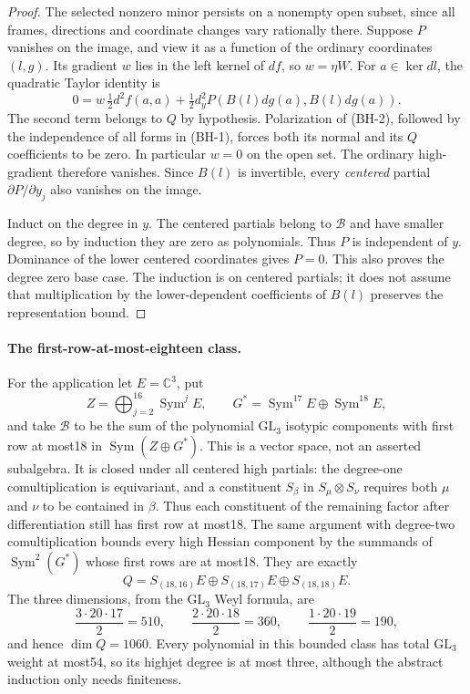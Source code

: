\begin{proof}
The selected nonzero minor persists on a nonempty open subset, since
all frames, directions and coordinate changes vary rationally there.
Suppose $P$ vanishes on the image, and view it as a function of the
ordinary coordinates $(l,g)$.  Its gradient $w$ lies in the left
kernel of $df$, so $w=\eta W$.  For $a\in\ker dl$, the quadratic
Taylor identity is
\[
 0=w\,\tfrac12d^2f(a,a)
       +\tfrac12 d_y^2P(B(l)dg(a),B(l)dg(a)).                  \tag{BH-2}
\]
The second term belongs to $Q$ by hypothesis.  Polarization of
(BH-2), followed by the independence of all forms in (BH-1), forces
both its normal and its $Q$ coefficients to be zero.  In particular
$w=0$ on the open set.  The ordinary high-gradient therefore vanishes.
Since $B(l)$ is invertible, every \emph{centered} partial
$\partial P/\partial y_j$ also vanishes on the image.

Induct on the degree in $y$.  The centered partials belong to
$\mathcal B$ and have smaller degree, so by induction they are zero
as polynomials.  Thus $P$ is independent of $y$.  Dominance of the
lower centered coordinates gives $P=0$.  This also proves the degree
zero base case.  The induction is on centered partials; it does not
assume that multiplication by the lower-dependent coefficients of
$B(l)$ preserves the representation bound.
\end{proof}

\paragraph{The first-row-at-most-eighteen class.}
For the application let $E=\mathbb C^3$, put
\[
 Z=\bigoplus_{j=2}^{16}\operatorname{Sym}^jE,
 \qquad G^*=\operatorname{Sym}^{17}E\oplus\operatorname{Sym}^{18}E,
\]
and take $\mathcal B$ to be the sum of the polynomial
$\mathrm{GL}_3$ isotypic components with first row at most18 in
$\operatorname{Sym}(Z\oplus G^*)$.  This is a vector space, not an
asserted subalgebra.  It is closed under all centered high partials:
the degree-one comultiplication is equivariant, and a constituent
$S_\beta$ in $S_\mu\otimes S_\nu$ requires both $\mu$ and $\nu$
to be contained in $\beta$.  Thus each constituent of the remaining
factor after differentiation still has first row at most18.
The same argument with degree-two comultiplication bounds every high
Hessian component by the summands of $\operatorname{Sym}^2(G^*)$
whose first rows are at most18.  They are exactly
\[
 Q=S_{(18,16)}E\oplus S_{(18,17)}E\oplus S_{(18,18)}E.         \tag{BH-3}
\]
The three dimensions, from the $\mathrm{GL}_3$ Weyl formula, are
\[
  \frac{3\cdot20\cdot17}{2}=510,\qquad
  \frac{2\cdot20\cdot18}{2}=360,\qquad
  \frac{1\cdot20\cdot19}{2}=190,
\]
and hence $\dim Q=1060$.  Every polynomial in this bounded class
has total $\mathrm{GL}_3$ weight at most54, so its highjet degree
is at most three, although the abstract induction only needs finiteness.

